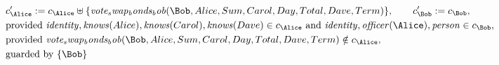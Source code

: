 \begin{align*}
&
c'_
{
\Alice
}
 := 
c_
{
\Alice
}
 \uplus 
\{
\mathit{
vote_swap_bonds_bob
}
(
\Bob
,
Alice
,
Sum
,
Carol
,
Day
,
Total
,
Dave
,
Term
)
\}
, \qquad 
c'_
{
\Bob
}
 := 
c_
{
\Bob
}
,\\
&
\text{provided } 
\mathit{
identity
}
,
\mathit{
knows
}
(
Alice
)
,
\mathit{
knows
}
(
Carol
)
,
\mathit{
knows
}
(
Dave
)
 \in c_
{
\Alice
}
 \text{ and } 
\mathit{
identity
}
,
\mathit{
officer
}
(
\Alice
)
,
\mathit{
person
}
 \in c_
{
\Bob
}
,\\
&
\text{provided } 
\mathit{
vote_swap_bonds_bob
}
(
\Bob
,
Alice
,
Sum
,
Carol
,
Day
,
Total
,
Dave
,
Term
)
 \notin c_
{
\Alice
}
,\\
&
\text{guarded by } \{
\Bob
\}
\end{align*}

